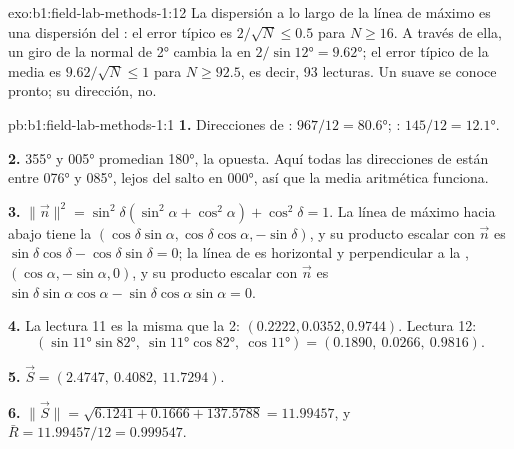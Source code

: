 \begin{solution}{exo:b1:field-lab-methods-1:12}
La dispersión a lo largo de la línea de máximo  es una dispersión del : el error típico
es $2/\sqrt N \le 0.5$ para $N \ge 16$. A través de ella, un giro de la normal de \ang{2} cambia la  en $2/\sin\ang{12} = \ang{9.62}$; el error típico de la  media es
$9.62/\sqrt N \le 1$ para $N \ge 92.5$, es decir, 93 lecturas. Un  suave se conoce pronto; su
dirección, no.
\end{solution}

\begin{solution}{pb:b1:field-lab-methods-1:1}
\textbf{1.} Direcciones de : $967/12 = \ang{80.6}$; : $145/12 =
\ang{12.1}$.

\textbf{2.} \ang{355} y \ang{005} promedian \ang{180}, la  opuesta. Aquí todas las direcciones de
 están entre \ang{076} y \ang{085}, lejos del salto en \ang{000}, así que la media aritmética
funciona.

\textbf{3.} $\|\vec n\|^2 = \sin^2\delta(\sin^2\alpha + \cos^2\alpha) +
\cos^2\delta = 1$. La línea de máximo  hacia abajo tiene la 
$(\cos\delta\sin\alpha, \cos\delta\cos\alpha, -\sin\delta)$, y su producto escalar con $\vec n$ es
$\sin\delta\cos\delta - \cos\delta\sin\delta = 0$; la línea de  es horizontal y perpendicular a la
, $(\cos\alpha, -\sin\alpha, 0)$, y su producto escalar con $\vec n$ es
$\sin\delta\sin\alpha\cos\alpha - \sin\delta\cos\alpha\sin\alpha = 0$.

\textbf{4.} La lectura 11 es la misma que la 2: $(0.2222, 0.0352, 0.9744)$. Lectura 12:
\[
  (\sin\ang{11}\sin\ang{82},\ \sin\ang{11}\cos\ang{82},\ \cos\ang{11}) =
  (0.1890,\ 0.0266,\ 0.9816).
\]

\textbf{5.} $\vec S = (2.4747,\ 0.4082,\ 11.7294)$.

\textbf{6.} $\|\vec S\| = \sqrt{6.1241 + 0.1666 + 137.5788} = 11.99457$, y
$\bar R = 11.99457/12 = 0.999547$.


\end{solution}

